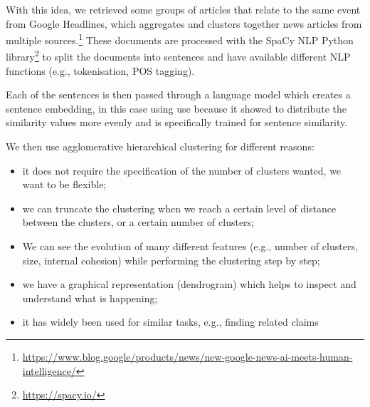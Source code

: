 With this idea, we retrieved some groups of articles that relate to the same event from Google Headlines, which aggregates and clusters together news articles from multiple sources.\footnote{\url{https://www.blog.google/products/news/new-google-news-ai-meets-human-intelligence/}}
These documents are processed with the SpaCy NLP Python library\footnote{\url{https://spacy.io/}} to split the documents into sentences and have available different NLP functions (e.g., tokenisation, POS tagging).

Each of the sentences is then passed through a language model which creates a sentence embedding, in this case using \acrshort{use} because it showed to distribute the similarity values more evenly and is specifically trained for sentence similarity.

We then use agglomerative hierarchical clustering for different reasons:
\begin{itemize}
    \item it does not require the specification of the number of clusters wanted, we want to be flexible;
    \item we can truncate the clustering when we reach a certain level of distance between the clusters, or a certain number of clusters;
    \item We can see the evolution of many different features (e.g., number of clusters, size, internal cohesion) while performing the clustering step by step;
    \item we have a graphical representation (dendrogram) which helps to inspect and understand what is happening;
    \item it has widely been used for similar tasks, e.g., finding related claims~\citep{almeida2020text}
\end{itemize}


